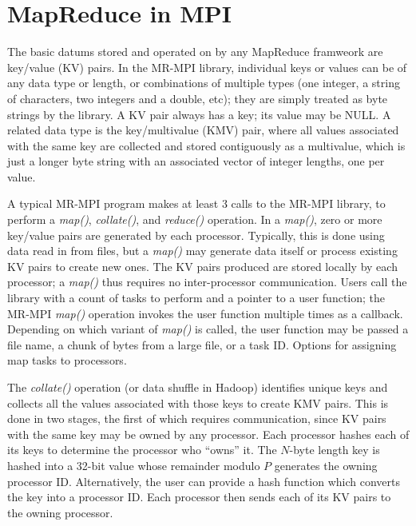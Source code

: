 \section{MapReduce in MPI}
\label{sec:mr}

The basic datums stored and operated on by any MapReduce framweork are
key/value (KV) pairs.  In the MR-MPI library, individual keys or
values can be of any data type or length, or combinations of multiple
types (one integer, a string of characters, two integers and a double,
etc); they are simply treated as byte strings by the library.  A KV
pair always has a key; its value may be NULL.  A related data type is
the key/multivalue (KMV) pair, where all values associated with the
same key are collected and stored contiguously as a multivalue, which
is just a longer byte string with an associated vector of integer
lengths, one per value.

A typical MR-MPI program makes at least 3 calls to the MR-MPI library,
to perform a {\it map()}, {\it collate()}, and {\it reduce()}
operation.  In a {\it map()}, zero or more key/value pairs are
generated by each processor.  Typically, this is done using data read
in from files, but a {\it map()} may generate data itself or process
existing KV pairs to create new ones.  The KV pairs produced are
stored locally by each processor; a {\it map()} thus requires no
inter-processor communication.  Users call the library with a count of
tasks to perform and a pointer to a user function; the MR-MPI {\it
map()} operation invokes the user function multiple times as a
callback.  Depending on which variant of {\it map()} is called, the
user function may be passed a file name, a chunk of bytes from a large
file, or a task ID.  Options for assigning map tasks to processors.

The {\it collate()} operation (or data shuffle in Hadoop) identifies
unique keys and collects all the values associated with those keys to
create KMV pairs.  This is done in two stages, the first of which
requires communication, since KV pairs with the same key may be owned
by any processor.  Each processor hashes each of its keys to determine
the processor who ``owns'' it.  The $N$-byte length key is hashed into
a 32-bit value whose remainder modulo $P$ generates the owning
processor ID.  Alternatively, the user can provide a hash function
which converts the key into a processor ID.  Each processor then sends
each of its KV pairs to the owning processor.

